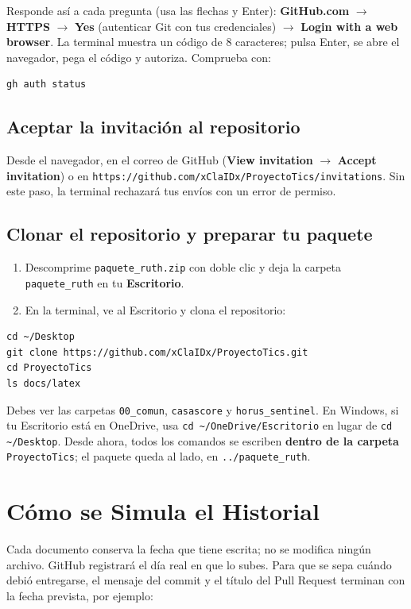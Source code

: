 \documentclass[11pt,a4paper]{article}
\begin{document}
\noindent Responde así a cada pregunta (usa las flechas y Enter): \textbf{GitHub.com} $\rightarrow$ \textbf{HTTPS} $\rightarrow$ \textbf{Yes} (autenticar Git con tus credenciales) $\rightarrow$ \textbf{Login with a web browser}. La terminal muestra un código de 8 caracteres; pulsa Enter, se abre el navegador, pega el código y autoriza. Comprueba con:

\begin{lstlisting}
gh auth status
\end{lstlisting}

\subsection{Aceptar la invitación al repositorio}
Desde el navegador, en el correo de GitHub (\textbf{View invitation} $\rightarrow$ \textbf{Accept invitation}) o en \nolinkurl{https://github.com/xClaIDx/ProyectoTics/invitations}. Sin este paso, la terminal rechazará tus envíos con un error de permiso.

\subsection{Clonar el repositorio y preparar tu paquete}
\begin{enumerate}[leftmargin=*]
    \item Descomprime \texttt{paquete\_ruth.zip} con doble clic y deja la carpeta \texttt{paquete\_ruth} en tu \textbf{Escritorio}.
    \item En la terminal, ve al Escritorio y clona el repositorio:
\end{enumerate}

\begin{lstlisting}
cd ~/Desktop
git clone https://github.com/xClaIDx/ProyectoTics.git
cd ProyectoTics
ls docs/latex
\end{lstlisting}

\noindent Debes ver las carpetas \texttt{00\_comun}, \texttt{casascore} y \texttt{horus\_sentinel}. En Windows, si tu Escritorio está en OneDrive, usa \nolinkurl{cd ~/OneDrive/Escritorio} en lugar de \nolinkurl{cd ~/Desktop}. Desde ahora, todos los comandos se escriben \textbf{dentro de la carpeta} \texttt{ProyectoTics}; el paquete queda al lado, en \nolinkurl{../paquete_ruth}.

\section{Cómo se Simula el Historial}
Cada documento conserva la fecha que tiene escrita; no se modifica ningún archivo. GitHub registrará el día real en que lo subes. Para que se sepa cuándo debió entregarse, el mensaje del commit y el título del Pull Request terminan con la fecha prevista, por ejemplo:
\end{document}
